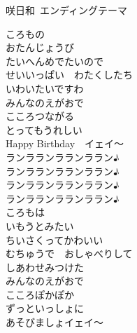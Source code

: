 
%
%

{咲日和~エンディングテーマ}
{\kasho\quad
%
%
%
%

ころもの\\
おたんじょうび\\
たいへんめでたいので\\

せいいっぱい　わたくしたち\\
いわいたいですわ\\

みんなのえがおで\\
こころつながる\\
とってもうれしい\\
Happy Birthday　イェイ～\\

ランラランラランララン♪\\
ランラランラランララン♪\\
ランラランラランララン♪\\
ランラランラランララン♪\\

ころもは\\
いもうとみたい\\
ちいさくってかわいい\\

むちゅうで　おしゃべりして\\
しあわせみつけた\\

みんなのえがおで\\
こころぽかぽか\\
ずっといっしょに\\
あそびましょイェイ～
}
